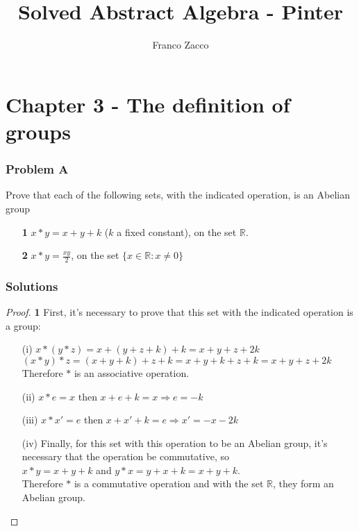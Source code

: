 \documentclass[11pt]{article}
\title{\textbf{Solved Abstract Algebra - Pinter}}
\author{Franco Zacco}
\date{}
\begin{document}
\maketitle
\thispagestyle{empty}

\section*{Chapter 3 - The definition of groups}

	\subsubsection*{Problem A}

		Prove that each of the following sets, with the indicated operation, is an Abelian group
		\begin{itemize}
			\item [\textbf{1}] $x * y = x+y+k$ ($k$ a fixed constant), on the set $\mathbb{R}$.
			\item [\textbf{2}] $x*y=\frac{xy}{2}$, on the set $\{ x \in \mathbb{R}: x \neq 0\}$
		\end{itemize}

	\subsubsection*{Solutions}

		\begin{proof}{\textbf{1}}
		First, it's necessary to prove that this set with the indicated operation is a group:
		\begin{itemize}
			\item [(i)]			
			$x*(y*z)=x+(y+z+k)+k = x+y+z+2k$ \\
			$(x*y)*z=(x+y+k)+z+k = x+y+k+z+k=x+y+z+2k$ \\
			Therefore $*$ is an associative operation.
			\item [(ii)] $x*e=x$ then $x+e+k=x \Rightarrow e=-k$
			\item [(iii)] $x*x'=e$ then $x+x'+k=e \Rightarrow x'=-x-2k$
			\item [(iv)] Finally, for this set with this operation to be an Abelian group, it's necessary that the operation be commutative, so \\
			$x*y =x+y+k$ and $y*x=y+x+k=x+y+k$.\\
			Therefore $*$ is a commutative operation and with the set $\mathbb{R}$, they form an Abelian group.
		\end{itemize}
		\end{proof}
\end{document}

